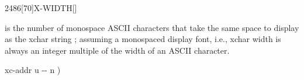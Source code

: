 \begin{worddef}{2486}[70]{X-WIDTH}[]%
\item {}

	 is the number of monospace ASCII characters that take the same
	space to display as the xchar string ; assuming a
	monospaced display font, i.e., xchar width is always an integer multiple
	of the width of an ASCII character.

	\begin{implement} %
	\word{:}   xc-addr u -{}- n ) \\
	    \word{+}   \\
	\tab[2]      \word{+} \\
	\tab {}  \word{-}  \word{;}
	\end{implement}
\end{worddef}


